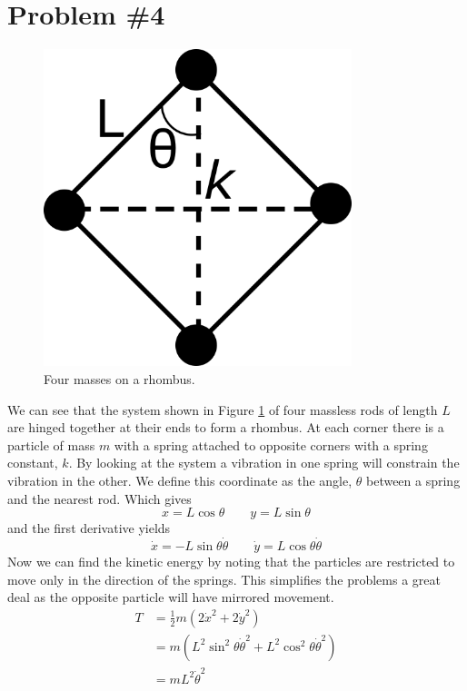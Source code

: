\documentclass[11pt]{article}
\numberwithin{equation}{section}
\begin{document}
\pagebreak

\section{Problem \#4}
\begin{figure}
\centering
\includegraphics[width=0.8\textwidth]{figure2.png}
\caption{Four masses on a rhombus.}
\label{figure2}
\end{figure}
We can see that the system shown in Figure \ref{figure2} of four massless rods of length $L$ are hinged together at their
ends to form a rhombus. At each corner there is a particle of mass $m$ with a spring attached
to opposite corners with a spring constant, $k$. By looking at the system a vibration in
one spring will constrain the vibration in the other. We define this coordinate as the angle, $\theta$
between a spring and the nearest rod. Which gives
$$x = L\cos\theta\qquad y = L\sin\theta$$
and the first derivative yields
$$\dot{x} = -L\sin\theta\dot{\theta}\qquad \dot{y} = L\cos\theta\dot{\theta}$$
Now we can find the kinetic energy by noting that the particles are restricted to move only 
in the direction of the springs. This simplifies the problems a great deal as the opposite 
particle will have mirrored movement.
\begin{align*}
T &= \frac{1}{2}m(2\dot{x}^2+2\dot{y}^2)\\
&= m(L^2\sin^2\theta\dot{\theta}^2+L^2\cos^2\theta\dot{\theta}^2)\\
&= mL^2\dot{\theta}^2
\end{align*}
\end{document}
